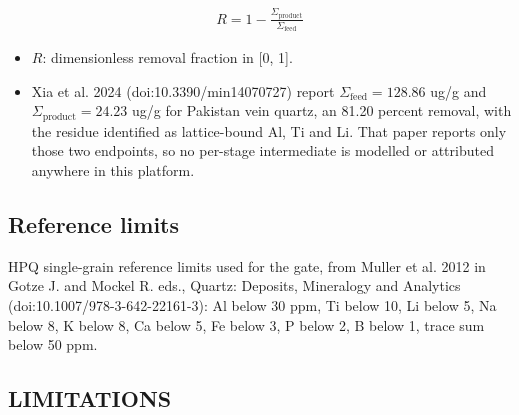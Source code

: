 \documentclass[10pt,a4paper,twoside]{report}
\begin{document}
\begin{equation*}
\begin{gathered}
R = 1 - \frac{\Sigma_{\text{product}}}{\Sigma_{\text{feed}}}
\end{gathered}
\end{equation*}

\begin{itemize}
\item $R$: dimensionless removal fraction in [0, 1].
\item Xia et al. 2024 (doi:10.3390/min14070727) report $\Sigma_{\text{feed}} = 128.86$ ug/g and $\Sigma_{\text{product}} = 24.23$ ug/g for Pakistan vein quartz, an 81.20 percent removal, with the residue identified as lattice-bound Al, Ti and Li. That paper reports only those two endpoints, so no per-stage intermediate is modelled or attributed anywhere in this platform.
\end{itemize}

\subsection*{Reference limits}

HPQ single-grain reference limits used for the gate, from Muller et al. 2012 in Gotze J. and Mockel R. eds., Quartz: Deposits, Mineralogy and Analytics (doi:10.1007/978-3-642-22161-3): Al below 30 ppm, Ti below 10, Li below 5, Na below 8, K below 8, Ca below 5, Fe below 3, P below 2, B below 1, trace sum below 50 ppm.

\subsection*{LIMITATIONS}
\end{document}
